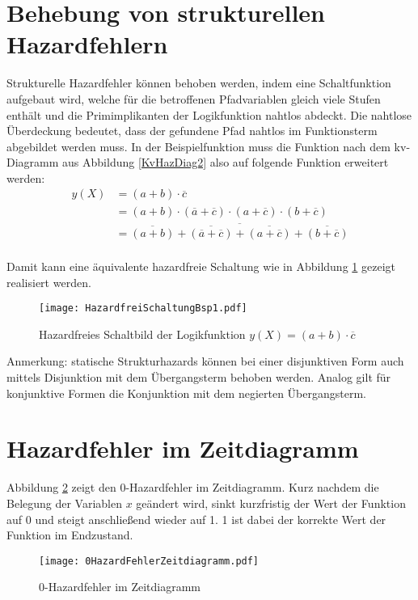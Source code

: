 \section{Behebung von strukturellen Hazardfehlern}
\label{struktHazBeh}
Strukturelle Hazardfehler können behoben werden, indem eine Schaltfunktion aufgebaut wird, welche für die betroffenen Pfadvariablen gleich viele Stufen enthält und die Primimplikanten der Logikfunktion nahtlos abdeckt. Die nahtlose Überdeckung bedeutet, dass der gefundene Pfad nahtlos im Funktionsterm abgebildet werden muss. In der Beispielfunktion muss die Funktion nach dem {\sc kv}-Diagramm aus Abbildung \ref{KvHazDiag2} also auf folgende Funktion erweitert werden:
\begin{align*}
	y(X) &= (a + b) \cdot \overline{c} \\
	     &= (a + b) \cdot (\overline{a} + \overline{c}) \cdot (a + \overline{c}) \cdot (b + \overline{c}) \\
	     &= \overline{\overline{(a + b)} + \overline{(\overline{a} + \overline{c})} + \overline{(a + \overline{c})} + \overline{(b + \overline{c})}} \\
\end{align*} 

Damit kann eine äquivalente hazardfreie Schaltung wie in Abbildung \ref{hazFrei} gezeigt realisiert werden.
\begin{figure}[htp]
	\centering
	\texttt{[image: HazardfreiSchaltungBsp1.pdf]}
	\caption{Hazardfreies Schaltbild der Logikfunktion $y(X) = (a + b) \cdot \overline{c}$}
	\label{hazFrei}
\end{figure}

Anmerkung: statische Strukturhazards können bei einer disjunktiven Form auch mittels Disjunktion mit dem Übergangsterm behoben werden. Analog gilt für konjunktive Formen die Konjunktion mit dem negierten Übergangsterm.

\section{Hazardfehler im Zeitdiagramm}
Abbildung \ref{0HazZeitDiag} zeigt den 0-Hazardfehler im Zeitdiagramm. Kurz nachdem die Belegung der Variablen $x$ geändert wird, sinkt kurzfristig der Wert der Funktion auf 0 und steigt anschließend wieder auf 1. 1 ist dabei der korrekte Wert der Funktion im Endzustand.
\begin{figure}[htp]
	\centering
	\texttt{[image: 0HazardFehlerZeitdiagramm.pdf]}
	\caption{0-Hazardfehler im Zeitdiagramm}
	\label{0HazZeitDiag}
\end{figure}

